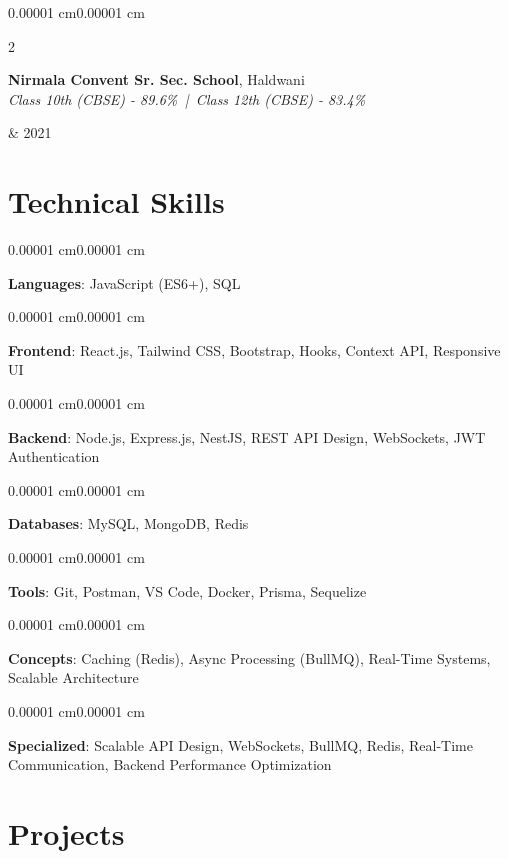 \documentclass[10pt, letterpaper]{article}
\newenvironment{onecolentry}{
    \begin{adjustwidth}{0.00001 cm}{0.00001 cm}
}{
    \end{adjustwidth}
}
\newenvironment{twocolentry}[2][]{
    \onecolentry
    \def\secondColumn{#2}
    \setcolumnwidth{\fill, 4.5 cm}
    \begin{paracol}{2}
}{
    \switchcolumn \raggedleft \secondColumn
    \end{paracol}
    \endonecolentry
}
\begin{document}
\vspace{0.15cm}

\begin{twocolentry}{2019 \& 2021}
\textbf{Nirmala Convent Sr. Sec. School}, Haldwani\\
\textit{Class 10th (CBSE) - 89.6\% \,|\, Class 12th (CBSE) - 83.4\%}
\end{twocolentry}

\section{Technical Skills}
\vspace{0.08cm}
\begin{onecolentry}
\textbf{Languages}: JavaScript (ES6+), SQL
\end{onecolentry}
\vspace{0.08cm}
\begin{onecolentry}
\textbf{Frontend}: React.js, Tailwind CSS, Bootstrap, Hooks, Context API, Responsive UI
\end{onecolentry}
\vspace{0.08cm}
\begin{onecolentry}
\textbf{Backend}: Node.js, Express.js, NestJS, REST API Design, WebSockets, JWT Authentication
\end{onecolentry}
\vspace{0.08cm}
\begin{onecolentry}
\textbf{Databases}: MySQL, MongoDB, Redis
\end{onecolentry}
\vspace{0.08cm}
\begin{onecolentry}
\textbf{Tools}: Git, Postman, VS Code, Docker, Prisma, Sequelize
\end{onecolentry}
\vspace{0.08cm}
\begin{onecolentry}
\textbf{Concepts}: Caching (Redis), Async Processing (BullMQ), Real-Time Systems, Scalable Architecture
\end{onecolentry}
\vspace{0.08cm}
\begin{onecolentry}
\textbf{Specialized}: Scalable API Design, WebSockets, BullMQ, Redis, Real-Time Communication, Backend Performance Optimization
\end{onecolentry}

\section{Projects}
\end{document}

